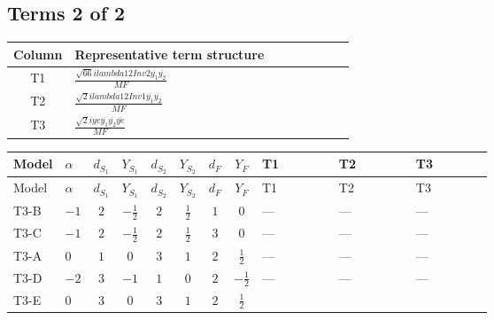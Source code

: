 \documentclass[8pt]{article}
\begin{document}
\begin{landscape}
\subsection*{Terms 2 of 2}
\begin{center}
\begin{tabular}{@{}c >{\raggedright\arraybackslash}p{0.82\linewidth}@{}}
\toprule
Column & Representative term structure \\
\midrule
T1 & \(\displaystyle \frac{\sqrt{66} i lambda12Inv2 \overline{y_{1}} \overline{y_{2}}}{MF}\) \\
\midrule
T2 & \(\displaystyle \frac{\sqrt{2} i lambda12Inv1 \overline{y_{1}} \overline{y_{2}}}{MF}\) \\
\midrule
T3 & \(\displaystyle \frac{\sqrt{2} i ye \overline{y_{1}} \overline{y_{2}} \overline{ye}}{MF}\) \\
\midrule
\bottomrule
\end{tabular}
\end{center}
\smallskip
\tiny
\begin{longtable}{@{}llcccccc >{\raggedright\arraybackslash}p{0.21\linewidth} >{\raggedright\arraybackslash}p{0.21\linewidth} >{\raggedright\arraybackslash}p{0.21\linewidth}@{}}
\toprule
Model & $\alpha$ & $d_{S_1}$ & $Y_{S_1}$ & $d_{S_2}$ & $Y_{S_2}$ & $d_F$ & $Y_F$ & T1 & T2 & T3 \\
\midrule
\endfirsthead
\toprule
Model & $\alpha$ & $d_{S_1}$ & $Y_{S_1}$ & $d_{S_2}$ & $Y_{S_2}$ & $d_F$ & $Y_F$ & T1 & T2 & T3 \\
\midrule
\endhead
T3-B & $-1$ & $2$ & $-\frac{1}{2}$ & $2$ & $\frac{1}{2}$ & $1$ & $0$ & --- & --- & --- \\
\midrule
T3-C & $-1$ & $2$ & $-\frac{1}{2}$ & $2$ & $\frac{1}{2}$ & $3$ & $0$ & --- & --- & --- \\
\midrule
T3-A & $0$ & $1$ & $0$ & $3$ & $1$ & $2$ & $\frac{1}{2}$ & --- & --- & --- \\
\midrule
T3-D & $-2$ & $3$ & $-1$ & $1$ & $0$ & $2$ & $-\frac{1}{2}$ & --- & --- & --- \\
\midrule
T3-E & $0$ & $3$ & $0$ & $3$ & $1$ & $2$ & $\frac{1}{2}$ & \scriptsize\adjustbox{max width=\linewidth}{$\begin{gathered} - \frac{3 \sqrt{66} i lambda12Inv2 \overline{y_{1}} \overline{y_{2}}}{44 MF}\end{gathered}$} & \scriptsize\adjustbox{max width=\linewidth}{$\begin{gathered} \frac{\sqrt{2} i lambda12Inv1 \overline{y_{1}} \overline{y_{2}}}{4 MF}\end{gathered}$} & \scriptsize\adjustbox{max width=\linewidth}{$\begin{gathered} \frac{\sqrt{2} i ye \overline{y_{1}} \overline{y_{2}} \overline{ye}}{8 MF}\end{gathered}$} \\
\midrule
\bottomrule
\end{longtable}
\clearpage

\end{landscape}
\end{document}
